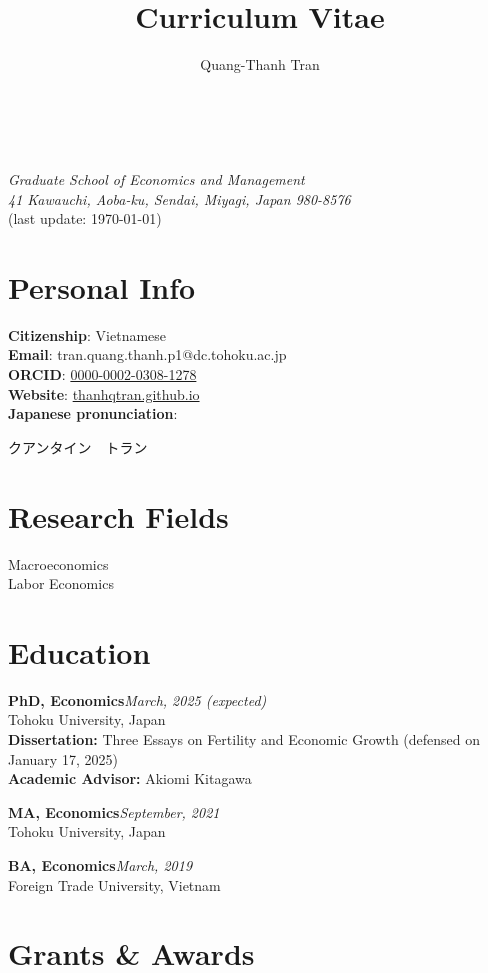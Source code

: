 \documentclass[12pt]{article}
\newcommand{\cvcolor}{\color{DodgerBlue4}} %
\renewcommand{\maketitle}{
\begin{center}
{\Huge\theauthor}\\
\vspace{0.5em}
{\Large \cvcolor{Tohoku University}}\\
{\itshape Graduate School of Economics and Management}\\
{\itshape 41 Kawauchi, Aoba-ku, Sendai, Miyagi, Japan 980-8576}\\
\vspace{0.25em}
{\color{Gray}(last update: \today)}
\end{center}
}
\begin{document}
\title{Curriculum Vitae} %
\author{Quang-Thanh Tran}

\maketitle


\section{Personal Info}
\textbf{Citizenship}: Vietnamese \\
\textbf{Email}: tran.quang.thanh.p1@dc.tohoku.ac.jp \\
\textbf{ORCID}: \href{https://orcid.org/0000-0002-0308-1278}{0000-0002-0308-1278}\\
\textbf{Website}: \href{https://thanhqtran.github.io}{thanhqtran.github.io} \\
\textbf{Japanese pronunciation}: \begin{CJK*}{UTF8}{min} クアンタイン　トラン　\end{CJK*}

\section{Research Fields}
Macroeconomics \\
Labor Economics

\section{Education}

\textbf{PhD, Economics}\hfill\emph{March, 2025 (expected)}\\
Tohoku University, Japan \\
\textbf{Dissertation:} Three Essays on Fertility and Economic Growth (defensed on January 17, 2025) \\
\textbf{Academic Advisor:} Akiomi Kitagawa


\textbf{MA, Economics}\hfill\emph{September, 2021}\\
Tohoku University, Japan

\textbf{BA, Economics}\hfill\emph{March, 2019}\\
Foreign Trade University, Vietnam


\section{Grants \& Awards}
\end{document}
